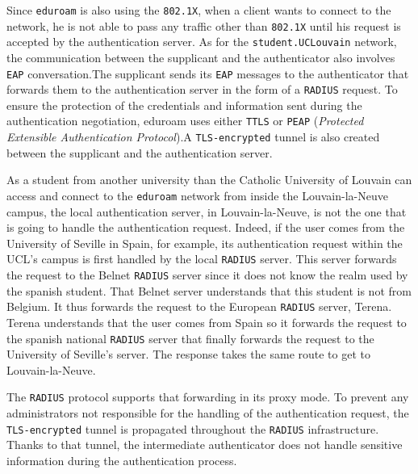 Since \texttt{eduroam} is also using the \texttt{802.1X}, when a client wants to connect to the network, he is not able to pass any traffic other than \texttt{802.1X} until his request is accepted by the authentication server. As for the \texttt{student.UCLouvain} network, the communication between the supplicant and the authenticator also involves \texttt{EAP} conversation.The supplicant sends its \texttt{EAP} messages to the authenticator that forwards them to the authentication server in the form of a \texttt{RADIUS} request. To ensure the protection of the credentials and information sent during the authentication negotiation, eduroam uses either \texttt{TTLS} or \texttt{PEAP} (\textit{Protected Extensible Authentication Protocol}).A \texttt{TLS-encrypted} tunnel is also created between the supplicant and the authentication server.

As a student from another university than the Catholic University of Louvain can access and connect to the \texttt{eduroam} network from inside the Louvain-la-Neuve campus, the local authentication server, in Louvain-la-Neuve, is not the one that is going to handle the authentication request. Indeed, if the user comes from the University of Seville in Spain, for example, its authentication request within the UCL's campus is first handled by the local \texttt{RADIUS} server. This server forwards the request to the Belnet \texttt{RADIUS} server since it does not know the realm used by the spanish student. That Belnet server understands that this student is not from Belgium. It thus forwards the request to the European \texttt{RADIUS} server, Terena. Terena understands that the user comes from Spain so it forwards the request to the spanish national \texttt{RADIUS} server that finally forwards the request to the University of Seville's server. The response takes the same route to get to Louvain-la-Neuve.

The \texttt{RADIUS} protocol supports that forwarding in its proxy mode. To prevent any administrators not responsible for the handling of the authentication request, the \texttt{TLS-encrypted} tunnel is propagated throughout the \texttt{RADIUS} infrastructure. Thanks to that tunnel, the intermediate authenticator does not handle sensitive information during the authentication process.

